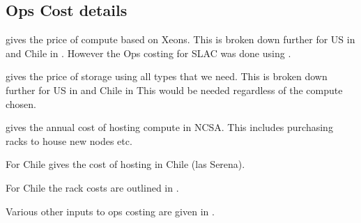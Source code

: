 \subsection{Ops Cost details}\label{sec:opsdetails}
 gives the price of compute based on Xeons.
This is broken down further for US in  and Chile in .
However the Ops costing for SLAC was done using .

 gives the price of storage using all  types that we need.
This is broken down further for US in  and Chile in 
This would be needed regardless of the compute chosen.








 gives the annual cost of hosting compute in NCSA. This includes purchasing racks to house
new nodes etc.


For Chile  gives the cost of hosting in Chile (las Serena).


For Chile the rack costs are outlined in .


Various other inputs to ops costing are given in .




